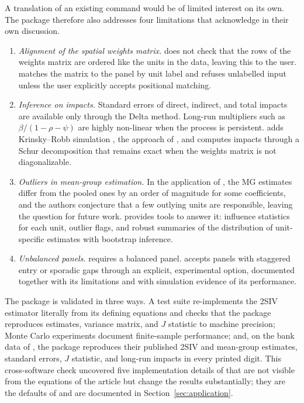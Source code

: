 \documentclass[article]{jss}
\begin{document}
A translation of an existing command would be of limited interest on its
own. The package therefore also addresses four limitations that
\citet{Kripfganz+Sarafidis:2025} acknowledge in their own discussion.

\begin{enumerate}
\item \emph{Alignment of the spatial weights matrix.} 
  does not check that the rows of the weights matrix are ordered like the
  units in the data, leaving this to the user.  matches the
  matrix to the panel by unit label and refuses unlabelled input unless the
  user explicitly accepts positional matching.
\item \emph{Inference on impacts.} Standard errors of direct, indirect, and
  total impacts are available only through the Delta method. Long-run
  multipliers such as $\beta/(1-\rho-\psi)$ are highly non-linear when the
  process is persistent.  adds Krinsky--Robb simulation
  \citep{Krinsky+Robb:1986}, the approach of \citet{LeSage+Pace:2009}, and
  computes impacts through a Schur decomposition that remains exact when the
  weights matrix is not diagonalizable.
\item \emph{Outliers in mean-group estimation.} In the application of
  \citet{Kripfganz+Sarafidis:2025}, the MG estimates differ from the pooled
  ones by an order of magnitude for some coefficients, and the authors
  conjecture that a few outlying units are responsible, leaving the question
  for future work.  provides tools to answer it: influence
  statistics for each unit, outlier flags, and robust summaries of the
  distribution of unit-specific estimates with bootstrap inference.
\item \emph{Unbalanced panels.}  requires a balanced
  panel.  accepts panels with staggered entry or sporadic gaps
  through an explicit, experimental option, documented together with its
  limitations and with simulation evidence of its performance.
\end{enumerate}

The package is validated in three ways. A test suite re-implements the 2SIV
estimator literally from its defining equations and checks that the package
reproduces estimates, variance matrix, and $J$ statistic to machine
precision; Monte Carlo experiments document finite-sample performance; and,
on the bank data of \citet{Kripfganz+Sarafidis:2025}, the package
reproduces their published 2SIV and mean-group estimates, standard errors,
$J$ statistic, and long-run impacts in every printed digit. This
cross-software check uncovered five implementation details of
 that are not visible from the equations of the article
but change the results substantially; they are the
defaults of  and are documented in Section~\ref{sec:application}.
\end{document}
